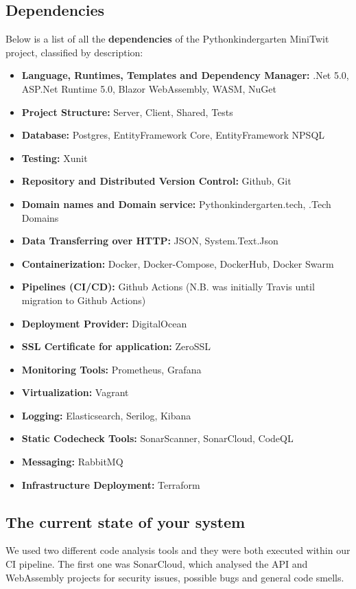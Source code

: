 \subsection{Dependencies}
Below is a list of all the \textbf{dependencies} of the Pythonkindergarten MiniTwit project, classified by description:
\begin{itemize}
    \item \textbf{Language, Runtimes, Templates and Dependency Manager:}
      .Net 5.0, ASP.Net Runtime 5.0, Blazor WebAssembly, WASM, NuGet
    \item \textbf{Project Structure:} Server, Client, Shared, Tests
    \item \textbf{Database:} Postgres, EntityFramework Core, EntityFramework NPSQL
    \item \textbf{Testing:} Xunit
    \item \textbf{Repository and Distributed Version Control:} Github, Git
    \item \textbf{Domain names and Domain service:} Pythonkindergarten.tech, .Tech Domains
    \item \textbf{Data Transferring over HTTP:} JSON, System.Text.Json
    \item \textbf{Containerization:} Docker, Docker-Compose, DockerHub, Docker Swarm
    \item \textbf{Pipelines (CI/CD):} Github Actions (N.B. was initially Travis until migration to Github Actions)
    \item \textbf{Deployment Provider:} DigitalOcean
    \item \textbf{SSL Certificate for application:} ZeroSSL
    \item \textbf{Monitoring Tools:} Prometheus, Grafana
    \item \textbf{Virtualization:} Vagrant
    \item \textbf{Logging:} Elasticsearch, Serilog, Kibana
    \item \textbf{Static Codecheck Tools:} SonarScanner, SonarCloud, CodeQL
    \item \textbf{Messaging:} RabbitMQ
    \item \textbf{Infrastructure Deployment:} Terraform
\end{itemize}


\subsection{The current state of your system}
We used two different code analysis tools and they were both executed within our CI pipeline. 
The first one was SonarCloud, which analysed the API and WebAssembly projects for security issues, possible bugs and general code smells.

